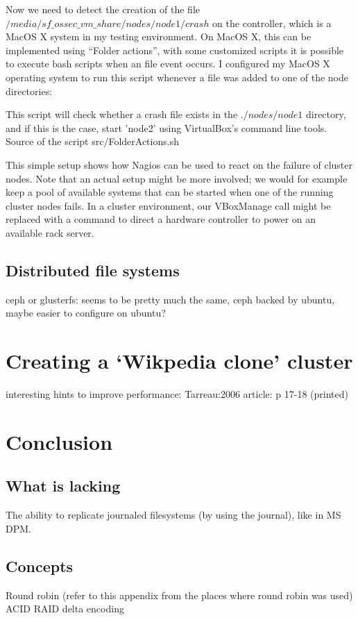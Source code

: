 \documentclass[12pt]{report}
\begin{document}
Now we need to detect the creation of the file
$/media/sf\_ossec\_vm\_share/nodes/node1/crash$  on the controller,
which is a MacOS X system in my testing environment. On MacOS X, this
can be implemented using ``Folder actions'', with some customized scripts
\cite{folder_actions_bash} it is possible to execute bash scripts when
an file event occurs.
I configured my MacOS X operating system to run this script whenever a
file was added to one of the node directories:

This script will check whether a crash file exists in the $./nodes/node1$
directory, and if this is the case, start 'node2' using VirtualBox's
command line tools. 
Source of the script src/FolderActions.sh

This simple setup shows how Nagios can be used to react on the failure
of cluster nodes. Note that an actual setup might be more
involved; we would for example keep a pool of available systems that
can be started when one of the running cluster nodes fails. In a
cluster environment, our VBoxManage call might be replaced with a
command to direct a hardware controller to power on an available rack server.



\section{Distributed file systems}

ceph or glusterfs: seems to be pretty much the same, ceph backed by
ubuntu, maybe easier to  configure on ubuntu?

\chapter{Creating a `Wikpedia clone' cluster}
interesting hints to improve performance: Tarreau:2006 article: p
17-18 (printed)

\chapter{Conclusion} %
\section{What is lacking}
The ability to replicate journaled filesystems (by using the journal),
like in MS DPM.

\begin{appendices}
\chapter{Concepts}
Round robin (refer to this appendix from the places where round robin
was used)
ACID
RAID
delta encoding
\end{appendices}




{}


\end{document}
